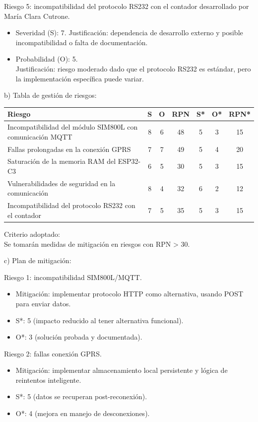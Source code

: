 \documentclass[
11pt, %
]{charter}
\begin{document}
Riesgo 5: incompatibilidad del protocolo RS232 con el contador desarrollado por María Clara Cutrone.
\begin{itemize}
\item Severidad (S): 7. 
Justificación: dependencia de desarrollo externo y posible incompatibilidad o falta de documentación.
\item Probabilidad (O): 5.\\
Justificación: riesgo moderado dado que el protocolo RS232 es estándar, pero la implementación específica puede variar.
\end{itemize}

b) Tabla de gestión de riesgos:

\begin{table}[htpb]
\centering
\begin{tabularx}{\linewidth}{@{}|X|c|c|c|c|c|c|@{}}
\hline
\rowcolor[HTML]{C0C0C0} 
Riesgo & S & O & RPN & S* & O* & RPN* \\ \hline
Incompatibilidad del módulo SIM800L con comunicación MQTT & 8 & 6 & 48 & 5 & 3 & 15 \\ \hline
Fallas prolongadas en la conexión GPRS & 7 & 7 & 49 & 5 & 4 & 20 \\ \hline
Saturación de la memoria RAM del ESP32-C3 & 6 & 5 & 30 & 5 & 3 & 15 \\ \hline
Vulnerabilidades de seguridad en la comunicación & 8 & 4 & 32 & 6 & 2 & 12 \\ \hline
Incompatibilidad del protocolo RS232 con el contador & 7 & 5 & 35 & 5 & 3 & 15 \\ \hline
\end{tabularx}%
\end{table}

Criterio adoptado: \\
Se tomarán medidas de mitigación en riesgos con RPN > 30.

c) Plan de mitigación:


Riesgo 1: incompatibilidad SIM800L/MQTT.
\begin{itemize}
\item Mitigación: implementar protocolo HTTP como alternativa, usando POST para enviar datos.
\item S*: 5 (impacto reducido al tener alternativa funcional).
\item O*: 3 (solución probada y documentada).
\end{itemize}

Riesgo 2: fallas conexión GPRS.
\begin{itemize}
\item Mitigación: implementar almacenamiento local persistente y lógica de reintentos inteligente.
\item S*: 5 (datos se recuperan post-reconexión).
\item O*: 4 (mejora en manejo de desconexiones).
\end{itemize}
\end{document}
